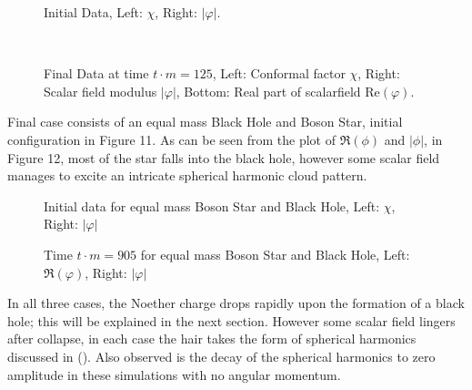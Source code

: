 \documentclass[11pt, oneside]{report}  %
\newcommand{\vp}{\varphi}
\numberwithin{equation}{section}
\begin{document}
  \begin{figure}[H]
  \caption{Initial Data, Left: $\chi$, Right: $|\vp|$.}
  \centering
  \hfill
\end{figure}
  \begin{figure}[H]
  \caption{Final Data at time $t\cdot m = 125$, Left: Conformal factor $\chi$, Right: Scalar field modulus $|\vp|$, Bottom: Real part of scalarfield $\mathrm{Re}(\vp).$}
  \centering
  \hfill
  \\
\end{figure}
Final case consists of an equal mass Black Hole and Boson Star, initial configuration in Figure 11. As can be seen from the plot of $\Re(\phi)$ and $|\phi|$, in Figure 12, most of the star falls into the black hole, however some scalar field manages to excite an intricate spherical harmonic cloud pattern.
  \begin{figure}[H]
  \caption{Initial data for equal mass Boson Star and Black Hole, Left: $\chi$, Right: $|\vp|$}
  \centering
  \hfill
\end{figure}
  \begin{figure}[H]
  \caption{Time $t\cdot m=905$ for equal mass Boson Star and Black Hole, Left: $\Re(\vp)$, Right: $|\vp|$}
  \centering
  \hfill
\end{figure}

In all three cases, the Noether charge drops rapidly upon the formation of a black hole; this will be explained in the next section. However some scalar field lingers after collapse, in each case the hair takes the form of spherical harmonics discussed in (). Also observed is the decay of the spherical harmonics to zero amplitude in these simulations with no angular momentum. 
 
\end{document}
